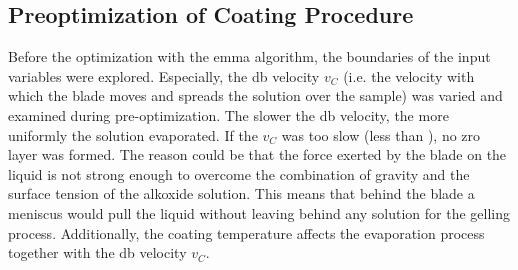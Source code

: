 \subsection{Preoptimization of Coating Procedure}
Before the optimization with the \gls{emma} algorithm, 
the boundaries of the input variables were explored. 
Especially, the \gls{db} velocity $v_{C}$ (i.e. the velocity with which the blade moves and spreads the solution over the sample)
was varied and examined during pre-optimization. 
The slower the \gls{db} velocity, the more uniformly the solution evaporated. 
If the $v_{C}$ was too slow (less than ), no \gls{zro} layer was formed. 
The reason could be that the force exerted by the blade on the liquid is not strong enough to overcome the combination of gravity and the surface tension of the alkoxide solution.
This means that behind the blade a meniscus would pull the liquid without leaving behind any solution for the gelling process. 
Additionally, the coating temperature affects the evaporation process together with the \gls{db} velocity $v_{C}$. 




